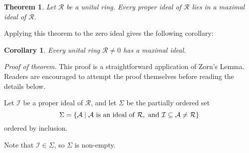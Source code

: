 \documentclass[12pt]{article}
\newtheorem*{thm*}{Theorem}
\newtheorem*{cor*}{Corollary}
\begin{document}

\begin{thm*}
Let $\mathcal{R}$ be a unital ring.
Every proper ideal of $\mathcal{R}$ lies in a maximal ideal of $\mathcal{R}$.
\end{thm*}

Applying this theorem to the zero ideal gives the following corollary:

\begin{cor*}
Every unital ring $\mathcal{R}\neq 0$ has a maximal ideal.
\end{cor*}

{\it Proof of theorem}.
This proof is a straightforward application of Zorn's Lemma.
Readers are encouraged to attempt the proof themselves
before reading the details below.

Let $\mathcal{I}$ be a proper ideal of $\mathcal{R}$,
and let $\Sigma$ be the partially ordered set
$$\Sigma=\{ \mathcal{A} \mid \mathcal{A} \hbox{ is an ideal of }
\mathcal{R},\hbox{ and }
\mathcal{I}\subseteq\mathcal{A}\neq \mathcal{R}\}$$
ordered by inclusion.

Note that $\mathcal{I}\in\Sigma$, so $\Sigma$ is non-empty.
\end{document}
